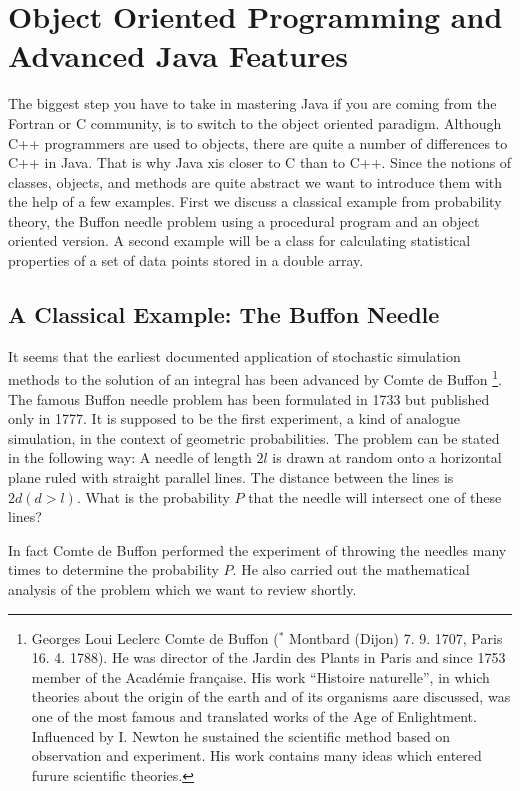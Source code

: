 \chapter[Object Oriented Programming]{Object Oriented Programming and Advanced Java Features}
\label{sec:objectoriented}

The biggest step you have to take in mastering Java if you are
coming from the Fortran or C community, is to switch to the object
oriented paradigm. Although C++ programmers are used to objects, there
are quite a number of differences to C++ in Java. That is why Java
xis closer to C than to C++. Since the notions of classes, objects, and
methods are quite abstract we want to introduce them with the help of
a few examples. First we discuss a classical example from probability theory,
the Buffon needle problem using a procedural program and an object oriented version.
A second example will be a class for calculating 
statistical properties of a set of data points stored in a double array.  


\section{A Classical Example: The Buffon Needle}

It seems that the earliest documented application of stochastic simulation
methods to the solution of an integral has been advanced by Comte de
Buffon \footnote{Georges Loui Leclerc Comte de Buffon ($^*$ Montbard
  (Dijon) 7. 9. 1707, \dag Paris 16. 4. 1788). He was director of the
  Jardin des Plants in Paris and since 1753 member of the Acad\'emie 
fran\c{c}aise. His  work ``Histoire naturelle'', in which theories
about the origin of the earth and of  its organisms aare discussed,
was one of the most famous and translated works of the Age of
Enlightment. Influenced by I. Newton he sustained the scientific
method based on observation and experiment. His work contains many
ideas which entered furure scientific theories.}. The famous Buffon
needle problem has been formulated in 1733 but published only in 1777. It is
supposed
to be the first experiment, a kind of analogue simulation, in the
context of geometric probabilities. The problem can be stated in the
following way: A needle of length $2l$ is drawn at random onto a
horizontal plane ruled with straight parallel lines. The distance
between the lines is $2d (d>l)$. 
What is the probability $P$ that the
needle will intersect one of these lines?

In fact Comte de Buffon performed the experiment of throwing the
needles many times to determine the probability $P$. He also carried
out the mathematical analysis of the problem which we want to review
shortly.

